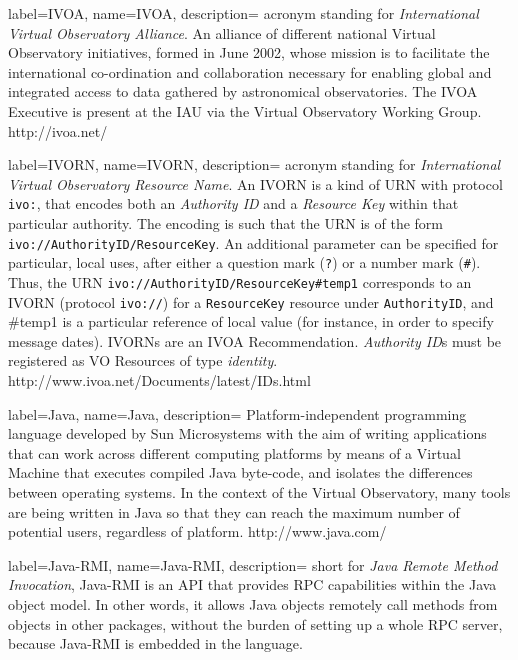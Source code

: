 {
    label={IVOA},
    name={IVOA},
    description={
    	acronym standing for \emph{International Virtual Observatory
        Alliance}. An alliance of different national \gls{Virtual
        Observatory} initiatives, formed in June 2002, whose mission is
        to facilitate the international co-ordination and collaboration
        necessary for enabling global and integrated access to data
        gathered by astronomical observatories. The IVOA Executive is
        present at the \gls{IAU} via the Virtual Observatory Working
        Group. http://ivoa.net/
    }
}

{
    label={IVORN},
    name={IVORN},
    description={
    	acronym standing for \emph{International Virtual Observatory
        Resource Name}. An IVORN is a kind of \gls{URN} with protocol
        \texttt{ivo:}, that encodes both an \emph{Authority ID} and a
        \emph{Resource Key} within that particular authority. The
        encoding is such that the URN is of the form
        \texttt{ivo://AuthorityID/ResourceKey}. An additional parameter
        can be specified for particular, local uses, after either a
        question mark (\texttt{?}) or a number mark (\texttt{#}). Thus,
        the URN \texttt{ivo://AuthorityID/ResourceKey#temp1}
        corresponds to an IVORN (protocol \texttt{ivo://}) for a
        \texttt{ResourceKey} resource under \texttt{AuthorityID}, and
        #temp1 is a particular reference of local value (for instance,
        in order to specify message dates). IVORNs are an \gls{IVOA
        Recommendation}. \emph{Authority ID}s must be registered as
        \gls{VO Resource}s of type \emph{identity}.
        http://www.ivoa.net/Documents/latest/IDs.html
    }
}

{
    label={Java},
    name={Java},
    description={
    	Platform-independent programming language developed by Sun
        Microsystems with the aim of writing applications that can work
        across different computing platforms by means of a \gls{Virtual
        Machine} that executes compiled Java byte-code, and isolates
        the differences between operating systems. In the context of
        the \gls{Virtual Observatory}, many tools are being written in
        Java so that they can reach the maximum number of potential
        users, regardless of platform. http://www.java.com/
    }
}

{
    label={Java-RMI},
    name={Java-RMI},
    description={
    	short for \emph{Java Remote Method Invocation}, Java-RMI is an
        \gls{API} that provides \gls{RPC} capabilities within the
        \gls{Java} object model. In other words, it allows Java objects
        remotely call methods from objects in other packages, without
        the burden of setting up a whole RPC server, because Java-RMI
        is embedded in the language.
    }
}

